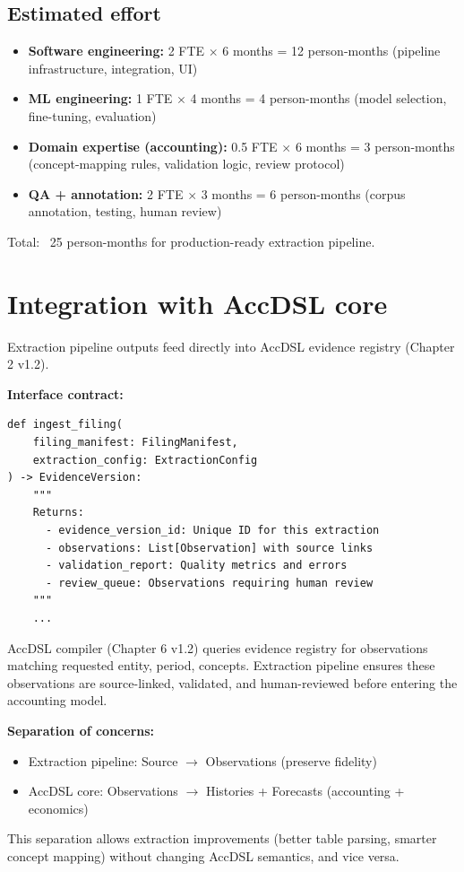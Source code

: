 \subsection{Estimated effort}

\begin{itemize}
\item \textbf{Software engineering:} 2 FTE $\times$ 6 months = 12 person-months
  (pipeline infrastructure, integration, UI)
\item \textbf{ML engineering:} 1 FTE $\times$ 4 months = 4 person-months (model
  selection, fine-tuning, evaluation)
\item \textbf{Domain expertise (accounting):} 0.5 FTE $\times$ 6 months = 3 person-months
  (concept-mapping rules, validation logic, review protocol)
\item \textbf{QA + annotation:} 2 FTE $\times$ 3 months = 6 person-months (corpus
  annotation, testing, human review)
\end{itemize}

Total: ~25 person-months for production-ready extraction pipeline.

\section{Integration with AccDSL core}

Extraction pipeline outputs feed directly into AccDSL evidence registry (Chapter 2 v1.2).

\textbf{Interface contract:}

\begin{lstlisting}
def ingest_filing(
    filing_manifest: FilingManifest,
    extraction_config: ExtractionConfig
) -> EvidenceVersion:
    """
    Returns:
      - evidence_version_id: Unique ID for this extraction
      - observations: List[Observation] with source links
      - validation_report: Quality metrics and errors
      - review_queue: Observations requiring human review
    """
    ...
\end{lstlisting}

AccDSL compiler (Chapter 6 v1.2) queries evidence registry for observations matching
requested entity, period, concepts. Extraction pipeline ensures these observations
are source-linked, validated, and human-reviewed before entering the accounting model.

\textbf{Separation of concerns:}
\begin{itemize}
\item Extraction pipeline: Source $\rightarrow$ Observations (preserve fidelity)
\item AccDSL core: Observations $\rightarrow$ Histories + Forecasts (accounting + economics)
\end{itemize}

This separation allows extraction improvements (better table parsing, smarter concept
mapping) without changing AccDSL semantics, and vice versa.
